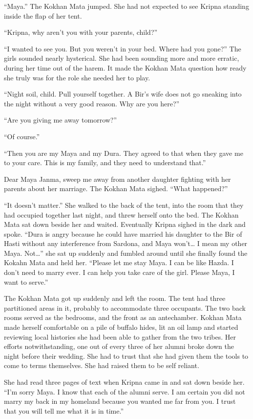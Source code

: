 \documentclass{article}
\begin{document}
	“Maya.” The Kokhan Mata jumped. She had not expected to see Kripna standing inside the flap of her tent.
	
	“Kripna, why aren’t you with your parents, child?”
	
	“I wanted to see you. But you weren’t in your bed. Where had you gone?” The girls sounded nearly hysterical. She had been sounding more and more erratic, during her time out of the harem. It made the Kokhan Mata question how ready she truly was for the role she needed her to play.
	
	“Night soil, child. Pull yourself together. A Bir’s wife does not go sneaking into the night without a very good reason. Why are you here?”
	
	“Are you giving me away tomorrow?”
	
	“Of course.” 
	
	“Then you are my Maya and my Dura. They agreed to that when they gave me to your care. This is my family, and they need to understand that.”
	
	Dear Maya Janma, sweep me away from another daughter fighting with her parents about her marriage. The Kokhan Mata sighed. “What happened?” 
	
	“It doesn’t matter.” She walked to the back of the tent, into the room that they had occupied together last night, and threw herself onto the bed. The Kokhan Mata sat down beside her and waited. Eventually Kripna sighed in the dark and spoke. “Dura is angry because he could have married his daughter to the Bir of Hasti without any interference from Sardona, and Maya won’t… I mean my other Maya. Not…” she sat up suddenly and fumbled around until she finally found the Kokahn Mata and held her. “Please let me stay Maya. I can be like Hazda. I don’t need to marry ever. I can help you take care of the girl. Please Maya, I want to serve.”
	
	The Kokhan Mata got up suddenly and left the room. The tent had three partitioned areas in it, probably to accommodate three occupants. The two back rooms served as the bedrooms, and the front as an antechamber. Kokhan Mata made herself comfortable on a pile of buffalo hides, lit an oil lamp and started reviewing local histories she had been able to gather from the two tribes. Her efforts notwithstanding, one out of every three of her alumni broke down the night before their wedding. She had to trust that she had given them the tools to come to terms themselves. She had raised them to be self reliant.
	
	She had read three pages of text when Kripna came in and sat down beside her. “I’m sorry Maya. I know that each of the alumni serve. I am certain you did not marry my back in my homeland because you wanted me far from you. I trust that you will tell me what it is in time.”
	
\end{document}
